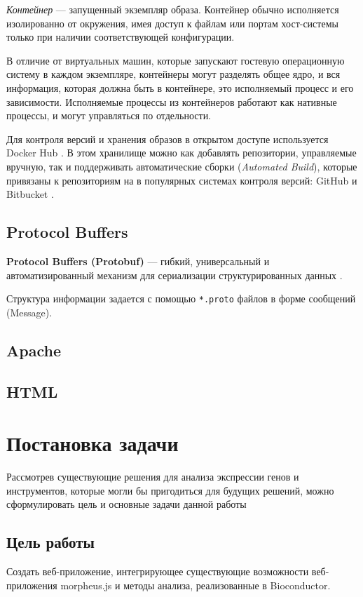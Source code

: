 \documentclass[specification,annotation]{itmo-student-thesis}
\begin{document}
\textit{Контейнер} --- запущенный экземпляр образа. Контейнер обычно исполняется изолированно от окружения, имея доступ к файлам или портам хост-системы только при наличии соответствующей конфигурации.

В отличие от виртуальных машин, которые запускают гостевую операционную систему в каждом экземпляре, контейнеры могут разделять общее ядро, и вся информация, которая должна быть в контейнере, это исполняемый процесс и его зависимости. Исполняемые процессы из контейнеров работают как нативные процессы, и могут управляться по отдельности. 

Для контроля версий и хранения образов в открытом доступе используется Docker Hub \cite{dhub}. В этом хранилище можно как добавлять репозитории, управляемые вручную, так и поддерживать автоматические сборки (\textit{Automated Build}), которые привязаны к репозиториям на в популярных системах контроля версий: GitHub \cite{github} и Bitbucket \cite{bitbucket}.

\subsection{Protocol Buffers}
\textbf{Protocol Buffers (Protobuf)} --- гибкий, универсальный и автоматизированный механизм для сериализации структурированных данных \cite{protobuf}.

Структура информации задается с помощью \texttt{*.proto} файлов в форме сообщений (Message).

\subsection{Apache}
\subsection{HTML}

\section{Постановка задачи}
Рассмотрев существующие решения для анализа экспрессии генов и инструментов, которые могли бы пригодиться для будущих решений, можно сформулировать цель и основные задачи данной работы

\subsection{Цель работы}
Создать веб-приложение, интегрирующее существующие возможности веб-приложения morpheus.js и методы анализа, реализованные в Bioconductor.
\end{document}
